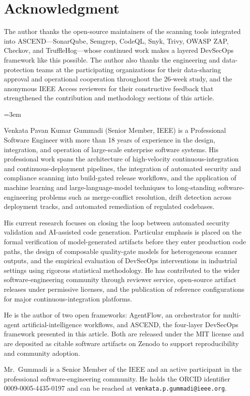 \documentclass{ieeeaccess}
\begin{document}
\section*{Acknowledgment}
The author thanks the open-source maintainers of the scanning tools integrated into ASCEND---SonarQube, Semgrep, CodeQL, Snyk, Trivy, OWASP ZAP, Checkov, and TruffleHog---whose continued work makes a layered DevSecOps framework like this possible. The author also thanks the engineering and data-protection teams at the participating organizations for their data-sharing approval and operational cooperation throughout the 26-week study, and the anonymous IEEE Access reviewers for their constructive feedback that strengthened the contribution and methodology sections of this article.

\sloppy\emergencystretch=3em



\begin{IEEEbiographynophoto}{Venkata Pavan Kumar Gummadi}
(Senior Member, IEEE) is a Professional Software Engineer with more than 18 years of experience in the design, integration, and operation of large-scale enterprise software systems. His professional work spans the architecture of high-velocity continuous-integration and continuous-deployment pipelines, the integration of automated security and compliance scanning into build-gated release workflows, and the application of machine learning and large-language-model techniques to long-standing software-engineering problems such as merge-conflict resolution, drift detection across deployment tracks, and automated remediation of regulated codebases.

His current research focuses on closing the loop between automated security validation and AI-assisted code generation. Particular emphasis is placed on the formal verification of model-generated artifacts before they enter production code paths, the design of composable quality-gate models for heterogeneous scanner outputs, and the empirical evaluation of DevSecOps interventions in industrial settings using rigorous statistical methodology. He has contributed to the wider software-engineering community through reviewer service, open-source artifact releases under permissive licenses, and the publication of reference configurations for major continuous-integration platforms.

He is the author of two open frameworks: AgentFlow, an orchestrator for multi-agent artificial-intelligence workflows, and ASCEND, the four-layer DevSecOps framework presented in this article. Both are released under the MIT license and are deposited as citable software artifacts on Zenodo to support reproducibility and community adoption.

Mr.\ Gummadi is a Senior Member of the IEEE and an active participant in the professional software-engineering community. He holds the ORCID identifier 0009-0005-4435-0197 and can be reached at \texttt{venkata.p.gummadi@ieee.org}.
\end{IEEEbiographynophoto}

\EOD
\end{document}
